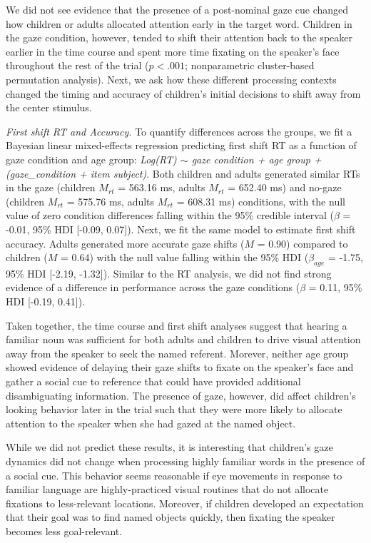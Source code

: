 \documentclass[man,floatsintext]{apa6}
\begin{document}
We did not see evidence that the presence of a post-nominal gaze cue
changed how children or adults allocated attention early in the target
word. Children in the gaze condition, however, tended to shift their
attention back to the speaker earlier in the time course and spent more
time fixating on the speaker's face throughout the rest of the trial
(\(p < .001\); nonparametric cluster-based permutation analysis). Next,
we ask how these different processing contexts changed the timing and
accuracy of children's initial decisions to shift away from the center
stimulus.

\emph{First shift RT and Accuracy.} To quantify differences across the
groups, we fit a Bayesian linear mixed-effects regression predicting
first shift RT as a function of gaze condition and age group:
\emph{Log(RT) \(\sim\) gaze condition + age group + (gaze\_condition +
item \textbar{} subject)}. Both children and adults generated similar
RTs in the gaze (children \(M_{rt}\) = 563.16 ms, adults \(M_{rt}\) =
652.40 ms) and no-gaze (children \(M_{rt}\) = 575.76 ms, adults
\(M_{rt}\) = 608.31 ms) conditions, with the null value of zero
condition differences falling within the 95\% credible interval
(\(\beta\) = -0.01, 95\% HDI {[}-0.09, 0.07{]}). Next, we fit the same
model to estimate first shift accuracy. Adults generated more accurate
gaze shifts (\(M\) = 0.90) compared to children (\(M\) = 0.64) with the
null value falling within the 95\% HDI (\(\beta_{age}\) = -1.75, 95\%
HDI {[}-2.19, -1.32{]}). Similar to the RT analysis, we did not find
strong evidence of a difference in performance across the gaze
conditions (\(\beta\) = 0.11, 95\% HDI {[}-0.19, 0.41{]}).

Taken together, the time course and first shift analyses suggest that
hearing a familiar noun was sufficient for both adults and children to
drive visual attention away from the speaker to seek the named referent.
Morever, neither age group showed evidence of delaying their gaze shifts
to fixate on the speaker's face and gather a social cue to reference
that could have provided additional disambiguating information. The
presence of gaze, however, did affect children's looking behavior later
in the trial such that they were more likely to allocate attention to
the speaker when she had gazed at the named object.

While we did not predict these results, it is interesting that
children's gaze dynamics did not change when processing highly familiar
words in the presence of a social cue. This behavior seems reasonable if
eye movements in response to familiar language are highly-practiced
visual routines that do not allocate fixations to less-relevant
locations. Moreover, if children developed an expectation that their
goal was to find named objects quickly, then fixating the speaker
becomes less goal-relevant.
\end{document}
